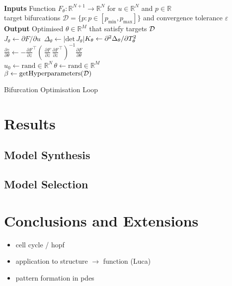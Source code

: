 \\
\begin{algorithm*}[H]
\label{alg:optimisation-loop}
\SetAlgoLined
\textbf{Inputs} Function $F_{\theta}:\mathbb{R}^{N+1}\rightarrow\mathbb{R}^{N}$ for $u\in\mathbb{R}^N$ and $p\in\mathbb{R}$\\ target bifurcations $\mathcal{D}=\{p:p\in[p_{\min},p_{\max}]\}$ and convergence tolerance $\varepsilon$\\
\textbf{Output} Optimised $\theta\in\mathbb{R}^M$ that satisfy targets $\mathcal{D}$\\
$J_{\theta}\leftarrow\partial F/\partial u$\qquad\,
$\Delta_{\theta}\leftarrow|\mathrm{det}\,J_{\theta}|$\qquad$K_{\theta}\leftarrow\partial^2\Delta_{\theta}/\partial T_{\theta}^2$\\
$\frac{\partial z}{\partial\theta}\leftarrow- \frac{\partial F}{\partial z}^\top
    \left(\,
        \frac{\partial F}{\partial z}\,\frac{\partial F}{\partial z}^\top
    \right)^{-1}
    \frac{\partial F}{\partial\theta}$\\
$u_0\leftarrow\mathrm{rand}\in\mathbb{R}^{N}$\quad\,$\theta\leftarrow\mathrm{rand}\in\mathbb{R}^{M}$\\
$\beta\leftarrow\mathrm{getHyperparameters}(\mathcal{D})$\\
\caption{Bifurcation Optimisation Loop}
\end{algorithm*}

\section{Results}

\subsection{Model Synthesis}

\subsection{Model Selection}




\section{Conclusions and Extensions}
\label{sec:conclusions}

\begin{itemize}
    \item cell cycle / hopf
    \item application to structure $\rightarrow$ function (Luca)
    \item pattern formation in pdes
\end{itemize}




